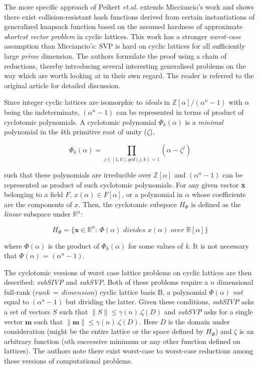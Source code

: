 \documentclass[10pt]{elsarticle}
\begin{document}
The more specific approach of Peikert \textit{et.al.}\cite{CRHF_Peikert2006} extends Micciancio's work and shows there exist collision-resistant hash functions derived from certain instantiations of generalized knapsack function based on the assumed hardness of approximate \textit{shortest vector problem} in cyclic lattices. This work has a stronger \textit{worst-case} assumption than Micciancio's: SVP is hard on cyclic lattices for all sufficiently large \textit{prime} dimension. The authors formulate the proof using a chain of reductions, thereby introducing several interesting generalised problems on the way which are worth looking at in their own regard. The reader is referred to the original article for detailed discussion.

Since integer cyclic lattices are isomorphic to \textit{ideals} in $\mathbb{Z}[\alpha]/(\alpha ^{n} - 1)$ with $\alpha$ being the indeterminate, $(\alpha ^{n} - 1)$ can be represented in terms of product of cyclotomic polynomials. A cyclotomic polynomial $\Phi_{k}(\alpha)$ is a \textit{minimal} polynomial in the \textit{k}th primitive root of unity ($\zeta$),

$$\Phi_{k}(\alpha) = \prod_{j \in [1, k]; gcd(j,k)=1} (\alpha - \zeta^{j})$$

such that these polynomials are irreducible over $\mathbb{Z}[\alpha]$ and $(\alpha ^{n} - 1)$ can be represented as product of such cyclotomic polynomials. For any given vector \textbf{x} belonging to a field $F$, $x(\alpha) \in F[\alpha]$, or a polynomial in $\alpha$ whose coefficients are the components of $x$. Then, the cyclotomic subspace $H_{\Phi}$ is defined as the \textit{linear} subspace under $\mathbb{R}^{n}$:

$$H_{\Phi} = \{ \mathbf{x} \in \mathbb{R}^{n}:\, \Phi(\alpha)\,\, divides\,\, x(\alpha)\,\, over\,\, \mathbb{R}[\alpha] \}$$

where $\Phi(\alpha)$ is the product of $\Phi_{k}(\alpha)$ for some values of \textit{k}. It is not necessary that $\Phi(\alpha)$ = $(\alpha ^{n} - 1)$.

The cyclotomic versions of worst case lattice problems on cyclic lattices are then described: \textit{subSIVP} and \textit{subSVP}. Both of these problems require a $n$ dimensional full-rank ($rank\,=\,dimension$) cyclic lattice basis B, a polynomial $\Phi(\alpha)$ \textit{not} equal to $(\alpha ^{n} - 1)$ but dividing the latter. Given these conditions, \textit{subSIVP} asks a set of vectors $S$ such that $\parallel S\parallel \leq \gamma(n).\zeta(D)$ and \textit{subSVP} asks for a single vector $\mathbf{m}$ such that $\parallel \mathbf{m}  \parallel \leq \gamma(n).\zeta(D)$. Here $D$ is the domain under consideration (might be the entire lattice or the space defined by $H_{\Phi}$) and $\zeta$ is an arbitrary function ($n$th successive minimum or any other function defined on lattices). The authors note there exist worst-case to worst-case reductions among these versions of computational problems.
\end{document}
